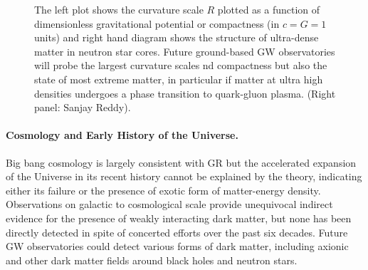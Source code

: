 \documentclass[twocolumn,aps,prd,nofootinbib,superscriptaddress,10pt,notitlepage,preprintnumbers] {revtex4-1}
\begin{document}
\begin{figure}
\caption{The left plot shows the curvature scale $R$ plotted as a function of dimensionless gravitational potential or compactness (in $c=G=1$ units) and right hand diagram shows the structure of ultra-dense matter in neutron star cores. Future ground-based GW observatories will probe the largest curvature scales nd compactness but also the state of most extreme matter, in particular if matter at ultra high densities undergoes a phase transition to quark-gluon plasma. (Right panel: Sanjay Reddy).}
\label{fig:TGR-EM}
\end{figure}

\noindent \paragraph{Cosmology and Early History of the Universe.}
Big bang cosmology is largely consistent with GR but the accelerated expansion of the Universe in its recent history cannot be explained by the theory, indicating either its failure or the presence of exotic form of matter-energy density. Observations on galactic to cosmological scale provide unequivocal indirect evidence for the presence of weakly interacting dark matter, but none has been directly detected in spite of concerted efforts over the past six decades. Future GW observatories could detect various forms of dark matter, including axionic and other dark matter fields around black holes and neutron stars. 
\end{document}

